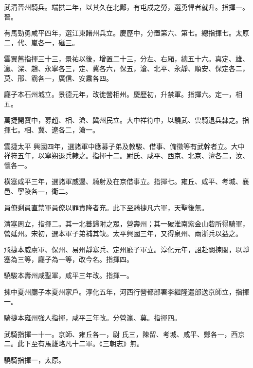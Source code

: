 \begin{pinyinscope}
 武清晉州騎兵。端拱二年，以其久在北鄙，有屯戍之勞，選勇悍者就升。指揮一。晉。



 有馬勁勇咸平四年，選江東諸州兵立。慶歷中，分置第六、第七。總指揮七。太原二，代、嵐各一，磁三。



 雲翼舊指揮三十三，景祐以後，增置二十三，分左、右廂，總五十六。真定、雄、瀛、深、趙、永寧各三，定、冀各六，保五，滄、北平、永靜、順安、保定各二，莫、邢、霸各一，廣信、安肅各四。



 廳子本石州城立。景德元年，改徙營相州。慶歷初，升禁軍。指揮六。定一，相五。



 萬捷開寶中，募趙、相、滄、冀州民立。大中祥符中，以驍武、雲騎退兵隸之。指揮七。相、冀、遼各二，滄一。



 雲捷太平
 興國四年，選諸軍中應募子弟及教駿、借事、備徵等有武幹者立。大中祥符五年，以寧朔退兵隸之。指揮十二。尉氏、咸平、西京、北京、澶各二，汝、懷各一。



 橫塞咸平三年，選諸軍威邊、騎射及在京借事立。指揮七。雍丘、咸平、考城、襄邑、寧陵各一，衛二。



 員僚剩員直禁軍員僚以罪責降者充。此下至騎捷凡六軍，天聖後無。



 清塞周立，指揮二。其一北蕃歸附之眾，營壽州；其一破淮南紫金山砦所得騎軍，營延州。宋初，選本軍子弟補其缺。太平興國三年，又得泉州、兩浙兵以益之。



 飛捷本威虜軍、保州、易州靜塞兵、定州廳子軍立。淳化元年，詔赴闕揀閱，以靜塞為三等，廳子為一等，改今名。指揮四。



 驍駿本壽州咸聖軍，咸平三年改。指揮一。



 揀中夏州廳子本夏州家戶。淳化五年，河西行營都部署李繼隆遣部送京師立，指揮一。



 騎捷本雍州強人指揮，咸平三年改。分營瀛、莫。指揮四。



 武騎指揮一十一。京師、雍丘各一，尉
 氏三，陳留、考城、咸平、鄭各一，西京二。此下至有馬雄略凡十二軍。《三朝志》無。



 驍騎指揮一，太原。




\end{pinyinscope}
